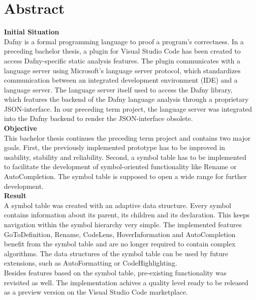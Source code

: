 \section{Abstract}
\label{section:abstract}

\textbf{Initial Situation}\\
Dafny is a formal programming language to proof a program's correctness.
In a preceding bachelor thesis, a plugin for Visual Studio Code has been created to access Dafny-specific static analysis features.
The plugin communicates with a language server using Microsoft's language server protocol, which standardizes communication between an integrated development environment (IDE) and a language server.
The language server itself used to access the Dafny library, which features the backend of the Dafny language analysis through a proprietary JSON-interface.
In our preceding term project, the language server was integrated into the Dafny backend to render the JSON-interface obsolete.\\

\textbf{Objective}\\
This bachelor thesis continues the preceding term project and contains two major goals.
First, the previously implemented prototype has to be improved in usability, stability and reliability.
Second, a symbol table has to be implemented to facilitate the development
of symbol-oriented functionality like Rename or AutoCompletion.
The symbol table is supposed to open a wide range for further development.\\

\textbf{Result}\\
A symbol table was created with an adaptive data structure.
Every symbol contains information about its parent, its children and its declaration.
This keeps navigation within the symbol hierarchy very simple.
The implemented features GoToDefinition, Rename, CodeLens, HoverInformation and AutoCompletion benefit from the symbol table and are no longer required to contain complex algorithms.
The data structures of the symbol table can be used by future extensions, such as AutoFormatting or CodeHighlighting.\\

Besides features based on the symbol table, pre-existing functionality was revisited as well.
The implementation achives a quality level ready to be released as a preview version on the Visual Studio Code marketplace.
